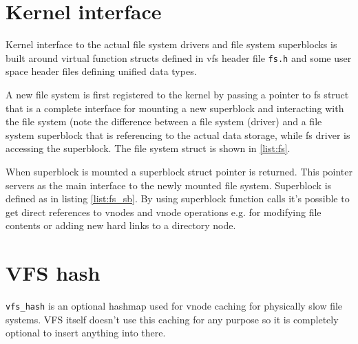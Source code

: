 \section{Kernel interface}

Kernel interface to the actual file system drivers and file system superblocks
is built around virtual function structs defined in \acs{vfs} header file
\verb+fs.h+ and some user space header files defining unified data types.

A new file system is first registered to the kernel by passing a pointer to
fs struct that is a complete interface for mounting a new superblock and
interacting with the file system (note the difference between a file system
(driver) and a file system superblock that is referencing to the actual data
storage, while fs driver is accessing the superblock. The file system struct
is shown in \ref{list:fs}.

When superblock is mounted a superblock struct pointer is returned. This pointer
servers as the main interface to the newly mounted file system. Superblock is
defined as in listing \ref{list:fs_sb}. By using superblock function calls it's
possible to get direct references to vnodes and \acs{vnode} operations e.g. for
modifying file contents or adding new hard links to a directory node.




\section{VFS hash}

\verb+vfs_hash+ is an optional hashmap used for vnode caching for physically
slow file systems. VFS itself doesn't use this caching for any purpose so
it is completely optional to insert anything into there.





